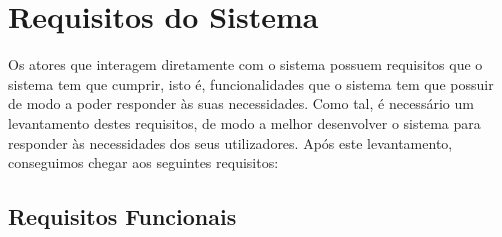 \chapter{Requisitos do Sistema}

Os atores que interagem diretamente com o sistema possuem requisitos que o 
sistema tem que cumprir, isto é, funcionalidades que o sistema tem que possuir
de modo a poder responder às suas necessidades. Como tal, é necessário um 
levantamento destes requisitos, de modo a melhor desenvolver o sistema para
responder às necessidades dos seus utilizadores. Após este levantamento,
conseguimos chegar aos seguintes requisitos:

\section{Requisitos Funcionais}

